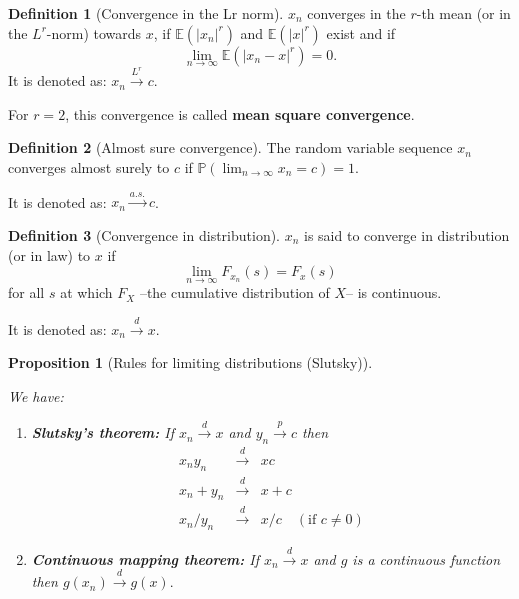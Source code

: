 \documentclass[
  12pt,
]{book}
\newtheorem{proposition}{Proposition}[chapter]
\theoremstyle{definition}
\newtheorem{definition}{Definition}[chapter]
\theoremstyle{definition}
\theoremstyle{definition}
\theoremstyle{definition}
\theoremstyle{remark}
\begin{document}
\begin{definition}[Convergence in the Lr norm]
\protect\hypertarget{def:convergenceLr}{}\label{def:convergenceLr}\(x_n\) converges in the \(r\)-th mean (or in the \(L^r\)-norm) towards \(x\), if \(\mathbb{E}(|x_n|^r)\) and \(\mathbb{E}(|x|^r)\) exist and if
\[
\lim_{n \rightarrow \infty} \mathbb{E}(|x_n - x|^r) = 0.
\]
It is denoted as: \(x_n \overset{L^r}{\rightarrow} c\).

For \(r=2\), this convergence is called \textbf{mean square convergence}.
\end{definition}

\begin{definition}[Almost sure convergence]
\protect\hypertarget{def:convergenceAlmost}{}\label{def:convergenceAlmost}The random variable sequence \(x_n\) converges almost surely to \(c\) if \(\mathbb{P}(\lim_{n \rightarrow \infty} x_n = c) = 1\).

It is denoted as: \(x_n \overset{a.s.}{\rightarrow} c\).
\end{definition}

\begin{definition}[Convergence in distribution]
\protect\hypertarget{def:cvgceDistri}{}\label{def:cvgceDistri}\(x_n\) is said to converge in distribution (or in law) to \(x\) if
\[
\lim_{n \rightarrow \infty} F_{x_n}(s) = F_{x}(s)
\]
for all \(s\) at which \(F_X\) --the cumulative distribution of \(X\)-- is continuous.

It is denoted as: \(x_n \overset{d}{\rightarrow} x\).
\end{definition}

\begin{proposition}[Rules for limiting distributions (Slutsky)]
\protect\hypertarget{prp:Slutsky}{}\label{prp:Slutsky}

We have:

\begin{enumerate}
\def\labelenumi{\roman{enumi}.}
\item
  \textbf{Slutsky's theorem:} If \(x_n \overset{d}{\rightarrow} x\) and \(y_n \overset{p}{\rightarrow} c\) then
  \begin{eqnarray*}
  x_n y_n &\overset{d}{\rightarrow}& x c \\
  x_n + y_n &\overset{d}{\rightarrow}& x + c \\
  x_n/y_n &\overset{d}{\rightarrow}& x / c \quad (\mbox{if }c \ne 0)
  \end{eqnarray*}
\item
  \textbf{Continuous mapping theorem:} If \(x_n \overset{d}{\rightarrow} x\) and \(g\) is a continuous function then \(g(x_n) \overset{d}{\rightarrow} g(x).\)
\end{enumerate}

\end{proposition}
\end{document}
